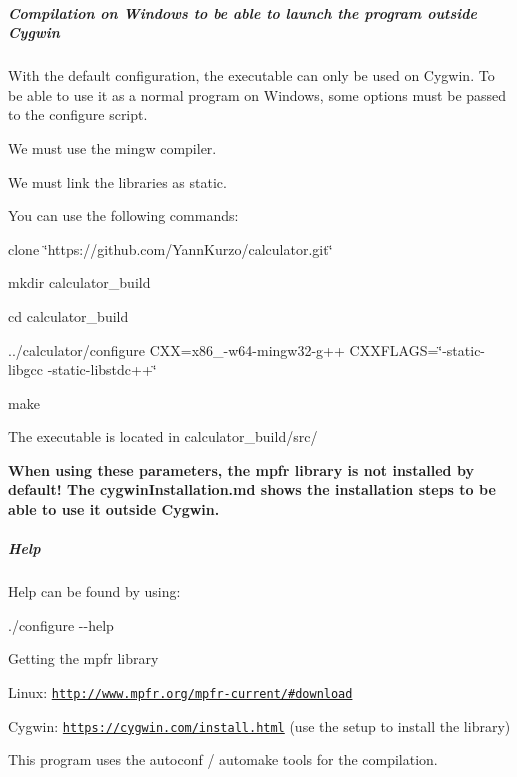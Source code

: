 \subparagraph*{Compilation on Windows to be able to launch the program outside Cygwin}


\begin{DoxyItemize}
\item With the default configuration, the executable can only be used on Cygwin. To be able to use it as a normal program on Windows, some options must be passed to the configure script.
\item We must use the mingw compiler.
\item We must link the libraries as static.
\item You can use the following commands\+:
\begin{DoxyItemize}
\item {\ttfamily clone \char`\"{}https\+://github.\+com/\+Yann\+Kurzo/calculator.\+git\char`\"{}}
\item {\ttfamily mkdir calculator\+\_\+build}
\item {\ttfamily cd calculator\+\_\+build}
\item {\ttfamily ../calculator/configure C\+X\+X=x86\+\_-\/w64-\/mingw32-\/g++ C\+X\+X\+F\+L\+A\+G\+S=\char`\"{}-\/static-\/libgcc -\/static-\/libstdc++\char`\"{}}
\item {\ttfamily make}
\item The executable is located in {\ttfamily calculator\+\_\+build/src/}
\end{DoxyItemize}
\item {\bfseries When using these parameters, the mpfr library is not installed by default! The cygwin\+Installation.\+md shows the installation steps to be able to use it outside Cygwin.}
\end{DoxyItemize}

\subparagraph*{Help}


\begin{DoxyItemize}
\item Help can be found by using\+:
\begin{DoxyItemize}
\item {\ttfamily ./configure -\/-\/help}
\end{DoxyItemize}
\item Getting the mpfr library
\begin{DoxyItemize}
\item Linux\+: \href{http://www.mpfr.org/mpfr-current/#download}{\tt http\+://www.\+mpfr.\+org/mpfr-\/current/\#download}
\item Cygwin\+: \href{https://cygwin.com/install.html}{\tt https\+://cygwin.\+com/install.\+html} (use the setup to install the library)
\end{DoxyItemize}
\item This program uses the autoconf / automake tools for the compilation.
\end{DoxyItemize}

